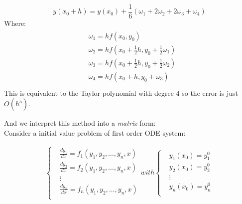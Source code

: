 \documentclass[a4paper]{article}
\begin{document}
\begin{equation}
y\left( {{x_0} + h} \right) = y\left( {{x_0}} \right) + \frac{1}{6}\left( {{\omega _1} + 2{\omega _2} + 2{\omega _3} + {\omega _4}} \right)
\end{equation}
Where:
\begin{eqnarray}     %
\left.                       %
\begin{array}{lll}       %
& {{\omega }_{1}}=hf\left( {{x}_{0}},{{y}_{0}} \right) \\
 & {{\omega }_{2}}=hf\left( {{x}_{0}}+\tfrac{1}{2}h,{{y}_{0}}+\tfrac{1}{2}{{\omega }_{1}} \right) \\
 & {{\omega }_{3}}=hf\left( {{x}_{0}}+\tfrac{1}{2}h,{{y}_{0}}+\tfrac{1}{2}{{\omega }_{2}} \right) \\
 & {{\omega }_{4}}=hf\left( {{x}_{0}}+h,{{y}_{0}}+{{\omega }_{3}} \right) \\
\end{array}              %
\right.                       %
\end{eqnarray}
This is equivalent to the Taylor polynomial with degree 4 so the error is just $O\left( {{h}^{5}} \right)$.

And we interpret this method into a \emph{matrix} form:\\
Consider a initial value problem of first order ODE system:

\begin{eqnarray}     %
\left\{                       %
\begin{array}{lll}       %
& \tfrac{d{{y}_{1}}}{dx}={{f}_{1}}({{y}_{1}},{{y}_{2}},\ldots ,{{y}_{n}},x) \\
& \tfrac{d{{y}_{2}}}{dx}={{f}_{2}}({{y}_{1}},{{y}_{2}},\ldots ,{{y}_{n}},x) \\
& \vdots  \\
& \tfrac{d{{y}_{n}}}{dx}={{f}_{n}}({{y}_{1}},{{y}_{2}},\ldots ,{{y}_{n}},x) \\
\end{array}              %
\right.
with
\left\{                       %
\begin{array}{lll}       %
& {{y}_{1}}({{x}_{0}})=y_{1}^{0} \\
& {{y}_{2}}({{x}_{0}})=y_{2}^{0} \\
& \vdots  \\
& {{y}_{n}}({{x}_{0}})=y_{n}^{0} \\
\end{array}              %
\right.                       %
\end{eqnarray}
\end{document}
